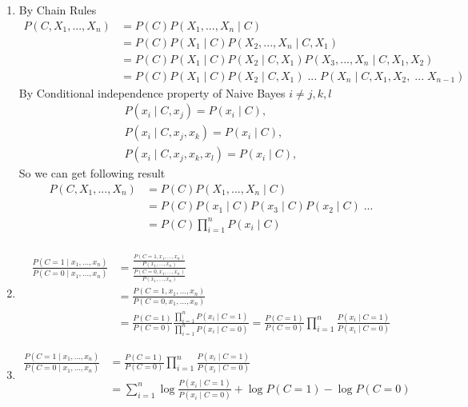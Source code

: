 \documentclass[12pt,a4paper]{article}
\begin{document}
\begin{enumerate}

\item By Chain Rules
\begin{align}
  \nonumber P(C,X_1,...,X_n)&=P(C)P(X_1,...,X_n\mid C)\\
  \nonumber &=P(C)P(X_1\mid C)P(X_2,...,X_n\mid C,X_1)\\
  \nonumber &=P(C)P(X_1\mid C)P(X_2\mid C,X_1)P(X_3,...,X_n\mid C,X_1,X_2)\\
  \nonumber &=P(C)P(X_1\mid C)P(X_2\mid C,X_1)\;...\;P(X_n\mid C,X_1,X_2,\;...\;X_{n-1})
\end{align}
By Conditional independence property of Naive Bayes $i\neq j,k,l$
\begin{align}
  \nonumber P(x_i\mid C,x_j)=P(x_i\mid C),\\
  \nonumber P(x_i\mid C,x_j,x_k)=P(x_i\mid C),\\
  \nonumber P(x_i\mid C,x_j,x_k,x_l)=P(x_i\mid C),
\end{align}
So we can get following result
\begin{align}
  \nonumber P(C,X_1,...,X_n)&= P(C)P(X_1,...,X_n\mid C)\\
  \nonumber &= P(C)P(x_1\mid C)P(x_3\mid C)P(x_2\mid C)\;...\\
  \nonumber &= P(C)\prod_{i=1}^{n}P(x_i\mid C)\\
\end{align}
\item
\begin{align}
  \nonumber \frac{P(C=1\mid x_1,...,x_n)}{P(C=0\mid x_1,...,x_n)} &= \frac{\frac{P(C=1,x_1,...,x_n)}{P(x_1,...,x_n)}}{\frac{P(C=0,x_1,...,x_n)}{P(x_1,...,x_n)}}\\
  \nonumber &=\frac{P(C=1,x_1,...,x_n)}{P(C=0,x_1,...,x_n)}\\
  \nonumber &=\frac{P(C=1)}{P(C=0)}\frac{\prod_{i=1}^{n}P(x_i\mid C=1)}{\prod_{i=1}^{n}P(x_i\mid C=0)}=\frac{P(C=1)}{P(C=0)}\prod_{i=1}^{n}\frac{P(x_i\mid C=1)}{P(x_i\mid C=0)}
\end{align}
\item
\begin{align}
  \nonumber \frac{P(C=1\mid x_1,...,x_n)}{P(C=0\mid x_1,...,x_n)}&=\frac{P(C=1)}{P(C=0)}\prod_{i=1}^{n}\frac{P(x_i\mid C=1)}{P(x_i\mid C=0)}\\
  \nonumber &=\sum_{i=1}^{n}\log\frac{P(x_i\mid C=1)}{P(x_i\mid C=0)}+\log{P(C=1)}-\log{P(C=0)}
\end{align}
\end{enumerate}
\end{document}
